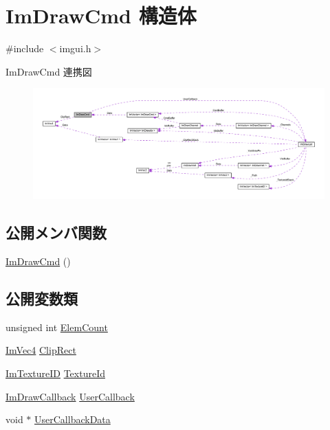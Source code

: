 \hypertarget{struct_im_draw_cmd}{}\section{Im\+Draw\+Cmd 構造体}
\label{struct_im_draw_cmd}


{\ttfamily \#include $<$imgui.\+h$>$}



Im\+Draw\+Cmd 連携図\nopagebreak
\begin{figure}[H]
\begin{center}
\leavevmode
\includegraphics[width=350pt]{struct_im_draw_cmd__coll__graph}
\end{center}
\end{figure}
\subsection*{公開メンバ関数}
\begin{DoxyCompactItemize}
\item 
\mbox{\hyperlink{struct_im_draw_cmd_adcf30cacb8e6b747e90000603c87f1e3}{Im\+Draw\+Cmd}} ()
\end{DoxyCompactItemize}
\subsection*{公開変数類}
\begin{DoxyCompactItemize}
\item 
unsigned int \mbox{\hyperlink{struct_im_draw_cmd_aafe2532964fb1f6905d67d84dd3e8730}{Elem\+Count}}
\item 
\mbox{\hyperlink{struct_im_vec4}{Im\+Vec4}} \mbox{\hyperlink{struct_im_draw_cmd_a838918f420ff81cb8dc7265077592daa}{Clip\+Rect}}
\item 
\mbox{\hyperlink{imgui_8h_a364f4447ecbc4ca176145ccff9db6286}{Im\+Texture\+ID}} \mbox{\hyperlink{struct_im_draw_cmd_a4f3b5985ece9ca6b71e7a8e7d85a82e5}{Texture\+Id}}
\item 
\mbox{\hyperlink{imgui_8h_a232a477233f9e3ab7640720bf94674de}{Im\+Draw\+Callback}} \mbox{\hyperlink{struct_im_draw_cmd_ad26dac4e939f5c4bb892cbca0f9e3af8}{User\+Callback}}
\item 
void $\ast$ \mbox{\hyperlink{struct_im_draw_cmd_ae2f5a0baf4a0b25942237b8ce6adb42d}{User\+Callback\+Data}}
\end{DoxyCompactItemize}


